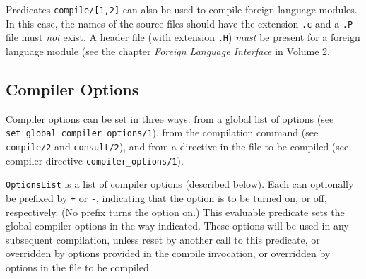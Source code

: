 Predicates {\tt compile/[1,2]} can also be used to compile foreign
language modules.  In this case, the names of the source files should
have the extension {\tt .c} and a {\tt .P} file must {\em not\/}
exist.  A header file (with extension {\tt .H}) {\em must} be present
for a foreign language module (see the chapter {\it Foreign Language
Interface} in Volume 2.


\subsection{Compiler Options}\label{compiler_options}

Compiler options can be set in three ways: from a global list of
options (see {\tt set\_global\_compiler\_options/1}), from the
compilation command (see {\tt compile/2} and {\tt consult/2}), and
from a directive in the file to be compiled (see compiler directive
{\tt compiler\_options/1}).

\begin{description}
    {\tt OptionsList} is a list of compiler options (described below).
    Each can optionally be prefixed by \verb|+| or \verb|-|,
    indicating that the option is to be turned on, or off,
    respectively.  (No prefix turns the option on.)  This evaluable
    predicate sets the global compiler options in the way indicated.
    These options will be used in any subsequent compilation, unless
    reset by another call to this predicate, or overridden by options
    provided in the compile invocation, or overridden by options in
    the file to be compiled.
\end{description}

